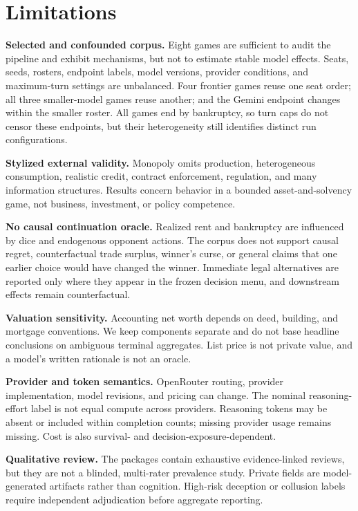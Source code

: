 \documentclass[conference]{IEEEtran}
\begin{document}
\section{Limitations}
\label{sec:limitations}

\textbf{Selected and confounded corpus.} Eight games are sufficient to audit the pipeline and exhibit mechanisms, but not to estimate stable model effects. Seats, seeds, rosters, endpoint labels, model versions, provider conditions, and maximum-turn settings are unbalanced. Four frontier games reuse one seat order; all three smaller-model games reuse another; and the Gemini endpoint changes within the smaller roster. All games end by bankruptcy, so turn caps do not censor these endpoints, but their heterogeneity still identifies distinct run configurations.

\textbf{Stylized external validity.} Monopoly omits production, heterogeneous consumption, realistic credit, contract enforcement, regulation, and many information structures. Results concern behavior in a bounded asset-and-solvency game, not business, investment, or policy competence.

\textbf{No causal continuation oracle.} Realized rent and bankruptcy are influenced by dice and endogenous opponent actions. The corpus does not support causal regret, counterfactual trade surplus, winner's curse, or general claims that one earlier choice would have changed the winner. Immediate legal alternatives are reported only where they appear in the frozen decision menu, and downstream effects remain counterfactual.

\textbf{Valuation sensitivity.} Accounting net worth depends on deed, building, and mortgage conventions. We keep components separate and do not base headline conclusions on ambiguous terminal aggregates. List price is not private value, and a model's written rationale is not an oracle.

\textbf{Provider and token semantics.} OpenRouter routing, provider implementation, model revisions, and pricing can change. The nominal reasoning-effort label is not equal compute across providers. Reasoning tokens may be absent or included within completion counts; missing provider usage remains missing. Cost is also survival- and decision-exposure-dependent.

\textbf{Qualitative review.} The packages contain exhaustive evidence-linked reviews, but they are not a blinded, multi-rater prevalence study. Private fields are model-generated artifacts rather than cognition. High-risk deception or collusion labels require independent adjudication before aggregate reporting.
\end{document}
